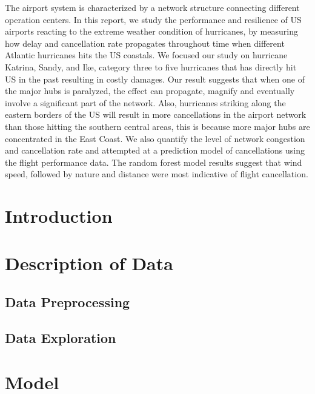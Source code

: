 \documentclass[12pt]{article}
\begin{document}
The airport system is characterized by a network structure connecting different operation centers. In this report, we study the performance and resilience of US airports reacting to the extreme weather condition of hurricanes, by measuring how delay and cancellation rate propagates throughout time when different Atlantic hurricanes hits the US coastals. We focused our study on hurricane Katrina, Sandy, and Ike, category three to five hurricanes that has directly hit US in the past resulting in costly damages. Our result suggests that when one of the major hubs is paralyzed, the effect can propagate, magnify and eventually involve a significant part of the network. Also, hurricanes striking along the eastern borders of the US will result in more cancellations in the airport network than those hitting the southern central areas, this is because more major hubs are concentrated in the East Coast. We also quantify the level of network congestion and cancellation rate and attempted at a prediction model of cancellations using the flight performance data. The random forest model results suggest that wind speed, followed by nature and distance were most indicative of flight cancellation. 

\section{Introduction} \label{sec:Intro}



\section{Description of Data} \label{sec:Descript} 

\subsection{Data Preprocessing}


\subsection{Data Exploration}


\section{Model} \label{sec:Model}

\end{document}
